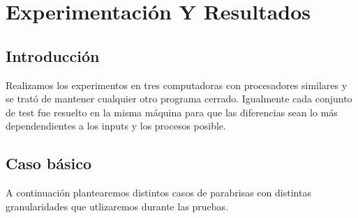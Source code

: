 \clearpage
\section{Experimentación Y Resultados}

\subsection{Introducción}
 Realizamos los experimentos en tres computadoras con procesadores similares y se trató de mantener cualquier otro programa cerrado. Igualmente cada conjunto de test fue resuelto en la misma máquina para que las diferencias sean lo más dependendientes a los inputs y los procesos posible.

\subsection{Caso básico}
A continuación plantearemos distintos casos de parabrisas con distintas granularidades que utlizaremos durante las pruebas. 

